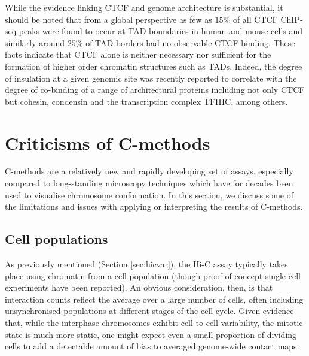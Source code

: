 \documentclass[a4paper,11pt,oneside]{book}
\begin{document}

While the evidence linking CTCF and genome architecture is substantial, it should be noted that from a global perspective as few as $15\%$ of all CTCF ChIP-seq peaks were found to occur at TAD boundaries in human and mouse cells\cite{Dixon2012} and similarly around $25\%$ of TAD borders had no observable CTCF binding.\cite{Sexton2015} These facts indicate that CTCF alone is neither necessary nor sufficient for the formation of higher order chromatin structures such as TADs. Indeed, the degree of insulation at a given genomic site was recently reported to correlate with the degree of co-binding of a range of architectural proteins including not only CTCF but cohesin, condensin and the transcription complex TFIIIC, among others.\cite{VanBortle2014}

%

\section{Criticisms of C-methods}

C-methods are a relatively new and rapidly developing set of assays, especially compared to long-standing microscopy techniques which have for decades been used to visualise chromosome conformation. In this section, we discuss some of the limitations and issues with applying or interpreting the results of C-methods.

\subsection{Cell populations}
As previously mentioned (Section \ref{sec:hicvar}), the Hi-C assay typically takes place using chromatin from a cell population (though proof-of-concept single-cell experiments have been reported\cite{Nagano2013}). An obvious consideration, then, is that interaction counts reflect the average over a large number of cells, often including unsynchronised populations at different stages of the cell cycle.\cite{Fraser2015} Given evidence that, while the interphase chromosomes exhibit cell-to-cell variability, the mitotic state is much more static,\cite{Naumova2013, Dekker2014} one might expect even a small proportion of dividing cells to add a detectable amount of bias to averaged genome-wide contact maps.
\end{document}
